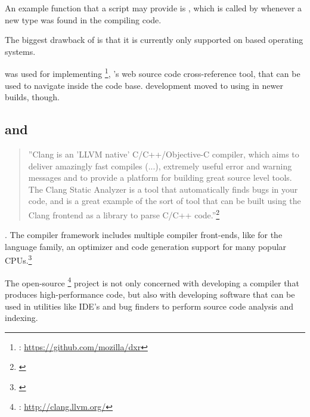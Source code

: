 An example function that a script may provide is , which is called by  whenever a new type was found in the compiling code.

The biggest drawback of  is that it is currently only supported on  based operating systems.

 was used for implementing \footnote{: \url{https://github.com/mozilla/dxr}}, 's web source code cross-reference tool, that can be used to navigate inside the  code base.  development moved to using  in newer builds, though.

\subsection{ and }
\label{sec:Clang}

\begin{quotation}
''Clang is an 'LLVM native' C/C++/Objective-C compiler, which aims to deliver amazingly fast compiles (...), extremely useful error and warning messages and to provide a platform for building great source level tools. The Clang Static Analyzer is a tool that automatically finds bugs in your code, and is a great example of the sort of tool that can be built using the Clang frontend as a library to parse C/C++ code.''\footnote{\citep{LLVMHP}}
\end{quotation}

. The  compiler framework includes multiple compiler front-ends, like  for the  language family, an optimizer and code generation support for many popular CPUs.\footnote{\citep{LLVMHP}}

The open-source \footnote{: \url{http://clang.llvm.org/}} project is not only concerned with developing a compiler that produces high-performance code, but also with developing software that can be used in utilities like IDE's and bug finders to perform source code analysis and indexing.

